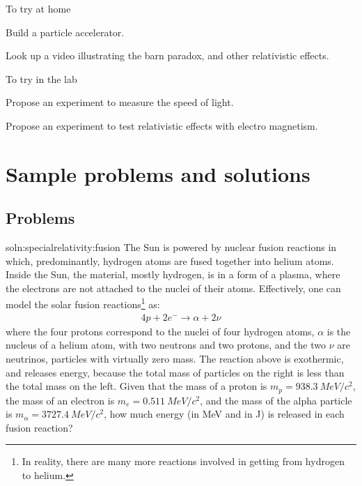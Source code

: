 \begin{chapteractivity}{To try at home}
	{
	\item Build a particle accelerator.
	\item Look up a video illustrating the barn paradox, and other relativistic effects.
	}
\end{chapteractivity}

\begin{chapteractivity}{To try in the lab}
	{
	 \item Propose an experiment to measure the speed of light.
	 \item Propose an experiment to test relativistic effects with electro magnetism.
	}
\end{chapteractivity}

\newpage
\section{Sample problems and solutions}
\subsection{Problems}
\begin{problem}{soln:specialrelativity:fusion}{\label{prob:specialrelativity:fusion} 
The Sun is powered by nuclear fusion reactions in which, predominantly, hydrogen atoms are fused together into helium atoms. Inside the Sun, the material, mostly hydrogen, is in a form of a plasma, where the electrons are not attached to the nuclei of their atoms. Effectively, one can model the solar fusion reactions\footnote{In reality, there are many more reactions involved in getting from hydrogen to helium.} as:
\begin{align*}
4p + 2e^- \to \alpha + 2\nu
\end{align*}
where the four protons correspond to the nuclei of four hydrogen atoms, $\alpha$ is the nucleus of a helium atom, with two neutrons and two protons, and the two $\nu$ are neutrinos, particles with virtually zero mass. The reaction above is exothermic, and releases energy, because the total mass of particles on the right is less than the total mass on the left. Given that the mass of a proton is $m_p=\SI{938.3}{MeV/c^2}$, the mass of an electron is $m_e=\SI{0.511}{MeV/c^2}$, and the mass of the alpha particle is $m_\alpha=\SI{3727.4}{MeV/c^2}$, how much energy (in \si{MeV} and in \si{J}) is released in each fusion reaction?
}
\end{problem}

